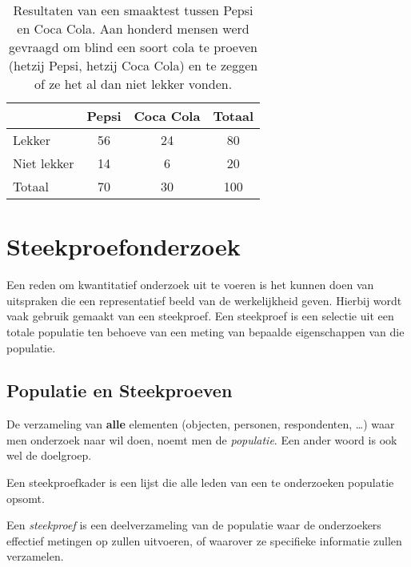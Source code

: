 \begin{table}
  \centering
  \begin{tabular}{l|cc|c}
  	            & Pepsi & Coca Cola & Totaal \\
  	\midrule
  	Lekker      &  56   &    24     &   80   \\
  	Niet lekker &  14   &     6     &   20   \\
  	\midrule
  	Totaal      &  70   &    30     &  100
  \end{tabular}
  \caption[Resultaten van een smaaktest tussen Pepsi en Coca Cola.]{Resultaten van een smaaktest tussen Pepsi en Coca Cola. Aan honderd mensen werd gevraagd om blind een soort cola te proeven (hetzij Pepsi, hetzij Coca Cola) en te zeggen of ze het al dan niet lekker vonden.}
  \label{tab:pepsi-coca}
\end{table}

\section{Steekproefonderzoek}
\label{sec:onderzoeksproces-steekproefonderzoek}

Een reden om kwantitatief onderzoek uit te voeren is het kunnen doen van uitspraken die een representatief beeld van de werkelijkheid geven. Hierbij wordt vaak gebruik gemaakt van een steekproef. Een steekproef is een selectie uit een totale populatie ten behoeve van een meting van bepaalde eigenschappen van die populatie.

\subsection{Populatie en Steekproeven}

\begin{definition}[Populatie]
  De verzameling van \textbf{alle} elementen (objecten, personen, respondenten, \ldots) waar men onderzoek naar wil doen, noemt men de \emph{populatie}. Een ander woord is ook wel de doelgroep.
\end{definition}

\begin{definition}[Steekproefkader]
  Een steekproefkader is een lijst die alle leden van een te onderzoeken populatie opsomt.
\end{definition}

\begin{definition}[Steekproef]
  Een \emph{steekproef} is een deelverzameling van de populatie waar de onderzoekers effectief metingen op zullen uitvoeren, of waarover ze specifieke informatie zullen verzamelen.
\end{definition}

